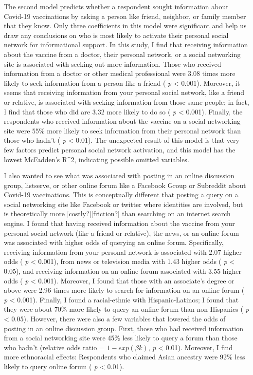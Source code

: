 The second model predicts whether a respondent sought information about
Covid-19 vaccinations by asking a person like friend, neighbor, or family member
that they know. Only three coefficients in this model were significant and help
us draw any conclusions on who is most likely to activate their personal social
network for informational support. In this study, I find that receiving
information about the vaccine from a doctor, their personal network, or a social
networking site is associated with seeking out more information. Those who
received information from a doctor or other medical professional were
3.08
times more likely to seek information from a person like a friend ( \emph{p} \textless{} 0.001).
Moreover, it seems that receiving information from your personal social network,
like a friend or relative, is associated with seeking information from those
same people; in fact, I find that those who did are
3.32 more
likely to do so ( \emph{p} \textless{} 0.001). Finally, the respondents who received information
about the vaccine on a social networking site were
55\%
more likely to seek information from their personal network than those who hadn't
( \emph{p} \textless{} 0.01). The unexpected result of this model is that very few factors predict
personal social network activation, and this model has the lowest McFadden's R\^{}2,
indicating possible omitted variables.

I also wanted to see what was associated with posting in an online discussion
group, listserve, or other online forum like a Facebook Group or Subreddit about
Covid-19 vaccinations. This is conceptually different that posting a query on a
social networking site like Facebook or twitter where identities are involved,
but is theoretically more {[}costly?{]}{[}friction?{]} than searching on an internet
search engine. I found that having received information about the vaccine from
your personal social network (like a friend or relative), the news, or an online
forum was associated with higher odds of querying an online forum. Specifically,
receiving information from your personal network is associated with
2.07
higher odds ( \emph{p} \textless{} 0.001), from news or television media with 1.43 higher odds ( \emph{p} \textless{} 0.05), and
receiving information on an online forum associated with
3.55
higher odds ( \emph{p} \textless{} 0.001). Moreover, I found that those with an associate's
degree or above were
2.96 times
more likely to search for information on an online forum ( \emph{p} \textless{} 0.001). Finally,
I found a racial-ethnic with Hispanic-Latinos; I found that they were about
70\%
more likely to query an online forum than non-Hispanics ( \emph{p} \textless{} 0.05). However,
there were also a few variables that lowered the odds of posting in an online
discussion group. First, those who had received information from a social
networking site were
45\%
less likely to query a forum than those who hadn't (relative odds ratio =
\(1 - exp(\beta k)\), \emph{p} \textless{} 0.01). Moreover, I find more ethnoracial effects:
Respondents who claimed Asian ancestry were
92\%
less likely to query online forum ( \emph{p} \textless{} 0.01).

